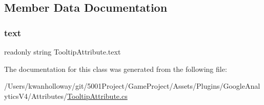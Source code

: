 \subsection{Member Data Documentation}
\mbox{\label{class_tooltip_attribute_a8a97f74ce0168aad448c16f69b786e6b}} 
\subsubsection{\texorpdfstring{text}{text}}
{\footnotesize\ttfamily readonly string Tooltip\+Attribute.\+text}



The documentation for this class was generated from the following file\+:\begin{DoxyCompactItemize}
\item 
/\+Users/kwanholloway/git/5001\+Project/\+Game\+Project/\+Assets/\+Plugins/\+Google\+Analytics\+V4/\+Attributes/\hyperlink{_tooltip_attribute_8cs}{Tooltip\+Attribute.\+cs}\end{DoxyCompactItemize}

